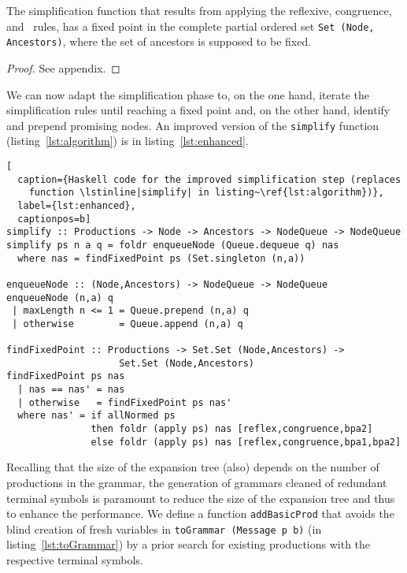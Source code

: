 
\begin{theorem}
  \label{thm:fixed_point}
  The simplification function that results from applying the
  reflexive, congruence, and \BPA\ rules, has a fixed point in the
  complete partial ordered set
  {\upshape\lstinline|Set (Node, Ancestors)|}, where the set of
  ancestors is supposed to be fixed. %
\end{theorem}
%
\begin{proof}
  See appendix.
\end{proof}

We can now adapt the
simplification phase to, on the one hand, iterate the simplification
rules until reaching a fixed point and, on the other hand, identify
and prepend promising nodes. An improved version of the
\lstinline|simplify| function (listing~\ref{lst:algorithm}) is in
listing~\ref{lst:enhanced}.

\begin{lstlisting}[
  caption={Haskell code for the improved simplification step (replaces
    function \lstinline|simplify| in listing~\ref{lst:algorithm})},
  label={lst:enhanced},
  captionpos=b]
simplify :: Productions -> Node -> Ancestors -> NodeQueue -> NodeQueue
simplify ps n a q = foldr enqueueNode (Queue.dequeue q) nas
  where nas = findFixedPoint ps (Set.singleton (n,a))

enqueueNode :: (Node,Ancestors) -> NodeQueue -> NodeQueue
enqueueNode (n,a) q
 | maxLength n <= 1 = Queue.prepend (n,a) q
 | otherwise        = Queue.append (n,a) q

findFixedPoint :: Productions -> Set.Set (Node,Ancestors) -> 
                    Set.Set (Node,Ancestors)
findFixedPoint ps nas
  | nas == nas' = nas
  | otherwise   = findFixedPoint ps nas'
  where nas' = if allNormed ps
               then foldr (apply ps) nas [reflex,congruence,bpa2]
               else foldr (apply ps) nas [reflex,congruence,bpa1,bpa2]
\end{lstlisting}

Recalling that the size of the expansion tree (also) depends on the 
number of productions in the grammar, the generation of grammars cleaned
of redundant terminal symbols is paramount to reduce the size of the
expansion tree and thus to enhance the performance. We define a 
function \lstinline|addBasicProd| that avoids the blind creation of 
fresh variables in \lstinline|toGrammar (Message p b)| 
(in listing~\ref{lst:toGrammar}) by a prior search for existing productions
with the respective terminal symbols.


